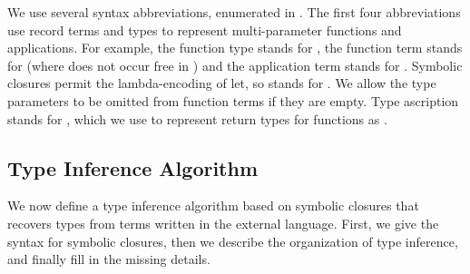 We use several syntax abbreviations, enumerated in
.
The first four abbreviations use record terms and types to represent multi-parameter functions
and applications.
For example, the function type
stands for
,
the function term
stands for 
(where {\ltivarp{}} does not occur free in {\ltiE{}})
and the application term
stands for
  .
Symbolic closures permit the lambda-encoding of let, so 
\ltilet{\ltivar{}}{\ltiE{}}{\ltiF{}}
stands for 
\ltiappParens{\ltiufun{\ltivar{}}{\ltiF{}}}{\ltiE{}}.
We allow the type parameters to be omitted from function terms if they are empty.
Type ascription
\ltianncolon{\ltiE{}}{\ltiS{}}
stands for
\ltiappParens{\ltifunargtype{\ltivar{}}{\ltiS{}}{\ltivar{}}}{\ltiE{}},
which we use to represent return types for functions
\ltifuntparamargrettype{\ltitvar{}}{\ltivar{}}{\ltiT{}}{\ltiS{}}{\ltiE{}}
as
\ltifuntparamargtype{\ltitvar{}}{\ltivar{}}{\ltiT{}}{\ltianncolon{\ltiE{}}{\ltiS{}}}.

\subsection{Type Inference Algorithm}

We now define a type inference algorithm based on symbolic closures
that recovers types from terms written in the external language.
First, we give the syntax for symbolic closures, then we describe
the organization of type inference, and finally fill in the missing details.

